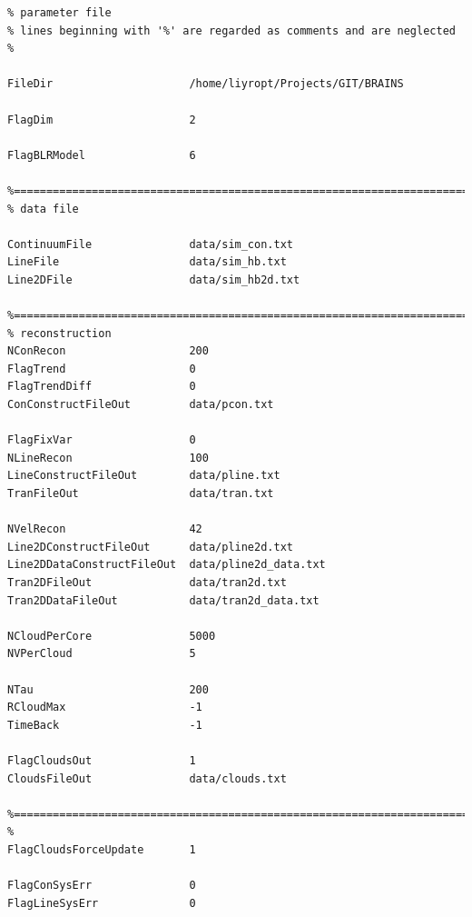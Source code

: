 \documentclass[oneside]{book}
\begin{document}
\begin{shaded}
\scriptsize
\begin{verbatim}
% parameter file
% lines beginning with '%' are regarded as comments and are neglected
% 

FileDir                     /home/liyropt/Projects/GIT/BRAINS     

FlagDim                     2                         

FlagBLRModel                6                           
       
%========================================================================
% data file

ContinuumFile               data/sim_con.txt          
LineFile                    data/sim_hb.txt          
Line2DFile                  data/sim_hb2d.txt        

%========================================================================
% reconstruction
NConRecon                   200                         
FlagTrend                   0                           
FlagTrendDiff               0                            
ConConstructFileOut         data/pcon.txt              

FlagFixVar                  0                           
NLineRecon                  100                         
LineConstructFileOut        data/pline.txt              
TranFileOut                 data/tran.txt               

NVelRecon                   42                          
Line2DConstructFileOut      data/pline2d.txt            
Line2DDataConstructFileOut  data/pline2d_data.txt       
Tran2DFileOut               data/tran2d.txt             
Tran2DDataFileOut           data/tran2d_data.txt       

NCloudPerCore               5000                        
NVPerCloud                  5                           

NTau                        200                         
RCloudMax                   -1                         
TimeBack                    -1                          

FlagCloudsOut               1                           
CloudsFileOut               data/clouds.txt             

%========================================================================
%
FlagCloudsForceUpdate       1                           

FlagConSysErr               0                           
FlagLineSysErr              0                           


\end{verbatim}
\end{shaded}
\end{document}
